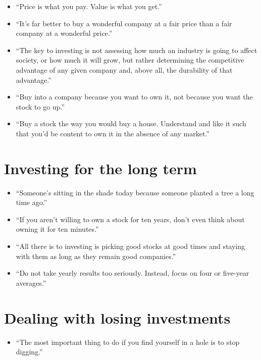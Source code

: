\documentclass[
]{book}
\providecommand{\tightlist}{%
  \setlength{\itemsep}{0pt}\setlength{\parskip}{0pt}}
\begin{document}
\begin{itemize}
\item
  ``Price is what you pay. Value is what you get.''
\item
  ``It's far better to buy a wonderful company at a fair price than a fair company at a wonderful price.''
\item
  ``The key to investing is not assessing how much an industry is going to affect society, or how much it will grow, but rather determining the competitive advantage of any given company and, above all, the durability of that advantage.''
\item
  ``Buy into a company because you want to own it, not because you want the stock to go up.''
\item
  ``Buy a stock the way you would buy a house. Understand and like it such that you'd be content to own it in the absence of any market.''
\end{itemize}

\hypertarget{investing-for-the-long-term}{%
\section{Investing for the long term}\label{investing-for-the-long-term}}

\begin{itemize}
\item
  ``Someone's sitting in the shade today because someone planted a tree a long time ago.''
\item
  ``If you aren't willing to own a stock for ten years, don't even think about owning it for ten minutes.''
\item
  ``All there is to investing is picking good stocks at good times and staying with them as long as they remain good companies.''
\item
  ``Do not take yearly results too seriously. Instead, focus on four or five-year averages.''
\end{itemize}

\hypertarget{dealing-with-losing-investments}{%
\section{Dealing with losing investments}\label{dealing-with-losing-investments}}

\begin{itemize}
\tightlist
\item
  ``The most important thing to do if you find yourself in a hole is to stop digging.''
\end{itemize}
\end{document}
